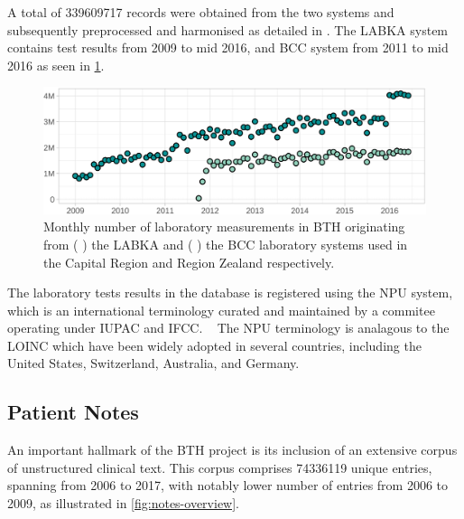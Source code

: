 A total of \num{339609717} records were obtained from the two systems
and subsequently preprocessed and harmonised as detailed in 
\textcite{musePopulationwide2023}.
The \ac{LABKA} system contains test results from 2009 to mid 2016,
and \ac{BCC} system from 2011 to mid 2016 
as seen in \cref{fig:biochem-overview}.

\begin{figure}[h!]
    \includegraphics[width=\textwidth]{graphics/bth-biochem}
    \caption{%
        Monthly number of laboratory measurements in \acf*{BTH}
        originating from 
        (\,\,) the \acs*{LABKA} and 
        (\,\,) the \acs*{BCC} laboratory systems
        used in the Capital Region and Region Zealand respectively.
    }
    \label{fig:biochem-overview}
\end{figure}%

The laboratory tests results in the database is registered using
the \ac{NPU} system, which is an international terminology
curated and maintained by a commitee operating under 
\ac{IUPAC} and \ac{IFCC}.
~\autocite{arendtExisting2020}
The \ac{NPU} terminology is analagous to the 
\ac{LOINC} which have been widely adopted in several countries,
including the United States, Switzerland, Australia, and Germany.
~\autocite{mcdonaldLOINC2003}

\subsection{Patient Notes}

An important hallmark of the \ac{BTH} project
is its inclusion of an extensive corpus of unstructured clinical text.
This corpus comprises \num{74336119} unique entries,
spanning from 2006 to 2017, 
with notably lower number of entries from 2006 to 2009,
as illustrated in \cref{fig:notes-overview}.

